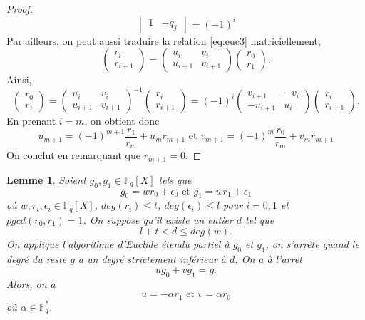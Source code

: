 \documentclass{article}
\newtheorem{lemma}{Lemme}
\theoremstyle{definition}
\theoremstyle{remark}
\begin{document}
\begin{proof}
\[\begin{vmatrix}
        1 & -q_{j}
    \end{vmatrix}
    = (-1)^i
    \]
    Par ailleurs, on peut aussi traduire la relation \ref{eq:euc3} matriciellement,
    \[
    \begin{pmatrix}
        r_i \\
        r_{i+1}
    \end{pmatrix}
    =
    \begin{pmatrix}
        u_{i} & v_{i} \\
        u_{i+1} & v_{i+1}
    \end{pmatrix}
    \begin{pmatrix}
        r_0 \\
        r_1
    \end{pmatrix}.
    \]
    Ainsi, 
    \[\begin{pmatrix}
        r_0 \\
        r_1
    \end{pmatrix}
    =
    \begin{pmatrix}
        u_{i} & v_{i} \\
        u_{i+1} & v_{i+1}
    \end{pmatrix} ^ {-1}
    \begin{pmatrix}
        r_i \\
        r_{i+1}
    \end{pmatrix}
    =
    (-1)^i
    \begin{pmatrix}
        v_{i+1} & -v_{i} \\
        -u_{i+1} & u_{i}
    \end{pmatrix}
    \begin{pmatrix}
        r_i \\
        r_{i+1}
    \end{pmatrix}.
    \]
    En prenant $i = m$, on obtient donc
    \[ u_{m+1} = (-1)^{m+1} \frac{r_{1}}{r_{m}} + u_{m}r_{m+1} \text{ et } v_{m+1} = (-1)^{m} \frac{r_{0}}{r_{m}} + v_{m}r_{m+1} \]
    On conclut en remarquant que $r_{m+1} = 0$.
\end{proof}

\begin{lemma}
\label{lem2}
    Soient $g_0, g_1 \in \mathbb{F}_q[X]$ tels que
    \[ g_0 = w r_0 + \epsilon_0 \text{ et } g_1 = w r_1 + \epsilon_1 \]
    où $w, r_i, \epsilon_i \in \mathbb{F}_q[X]$, $deg(r_i) \le t$, $deg(\epsilon_i) \le l$ pour $i = 0, 1$ et $pgcd(r_0, r_1) = 1$.
    On suppose qu'il existe un entier $d$ tel que
    \[ l + t < d \le deg(w). \]
    On applique l'algorithme d'Euclide étendu partiel à $g_0$ et $g_1$, on s'arrête quand le degré du reste $g$ a un degré strictement inférieur à $d$. On a à l'arrêt
    \[ ug_0 + vg_1 = g. \]
    Alors, on a
    \[ u = -\alpha r_1 \text{ et } v = \alpha r_0 \]
    où $\alpha \in \mathbb{F}_q^*$.
\end{lemma}
\end{document}
